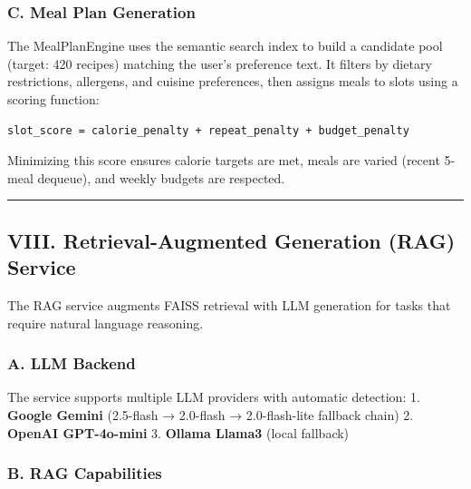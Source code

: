 \documentclass[10pt,conference,compsoc]{IEEEtran}
\begin{document}
\subsubsection{C. Meal Plan Generation}\label{c.-meal-plan-generation}

The MealPlanEngine uses the semantic search index to build a candidate
pool (target: 420 recipes) matching the user's preference text. It
filters by dietary restrictions, allergens, and cuisine preferences,
then assigns meals to slots using a scoring function:

\begin{lstlisting}
slot_score = calorie_penalty + repeat_penalty + budget_penalty
\end{lstlisting}

Minimizing this score ensures calorie targets are met, meals are varied
(recent 5-meal dequeue), and weekly budgets are respected.

\begin{center}\rule{0.5\linewidth}{0.5pt}\end{center}

\subsection{VIII. Retrieval-Augmented Generation (RAG)
Service}\label{viii.-retrieval-augmented-generation-rag-service}

The RAG service augments FAISS retrieval with LLM generation for tasks
that require natural language reasoning.

\subsubsection{A. LLM Backend}\label{a.-llm-backend}

The service supports multiple LLM providers with automatic detection: 1.
\textbf{Google Gemini} (2.5-flash → 2.0-flash → 2.0-flash-lite fallback
chain) 2. \textbf{OpenAI GPT-4o-mini} 3. \textbf{Ollama Llama3} (local
fallback)

\subsubsection{B. RAG Capabilities}\label{b.-rag-capabilities}
\end{document}
